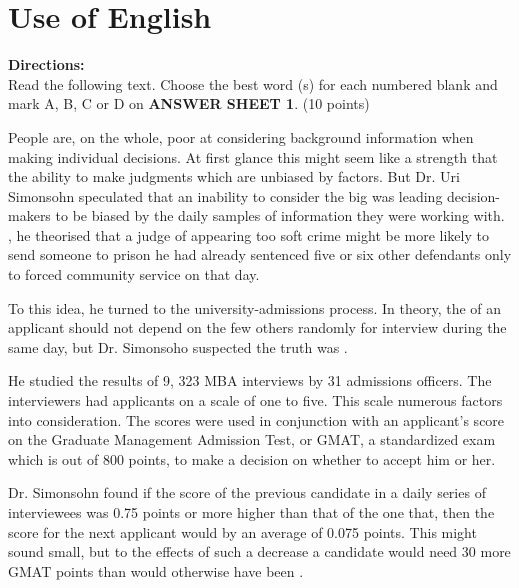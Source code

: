 



\section{Use of English}

\noindent
\textbf{Directions:}\\
Read the following text. Choose the best word (s) for each
	numbered blank and mark A, B, C or D on \textbf{ANSWER SHEET 1}. (10 points)



\TiGanSpace


People are, on the whole, poor at considering background information
when making individual decisions. At first glance this might seem like a
strength that \cloze the ability to make judgments which are
unbiased by \cloze factors. But Dr. Uri Simonsohn speculated that
an inability to consider the big \cloze was leading
decision-makers to be biased by the daily samples of information they
were working with. \cloze , he theorised that a
judge \cloze of appearing too soft \cloze crime might be
more likely to send someone to prison \cloze he had already
sentenced five or six other defendants only to forced community service
on that day.

To \cloze this idea, he turned to the university-admissions
process. In theory, the \cloze of an applicant should not depend
on the few others \cloze randomly for interview during the same
day, but Dr. Simonsoho suspected the truth was \cloze.

He studied the results of 9, 323 MBA interviews \cloze by 31
admissions officers. The interviewers had \cloze applicants on a
scale of one to five. This scale \cloze numerous factors into
consideration. The scores were \cloze used in conjunction with
an applicant's score on the Graduate Management Admission Test, or GMAT,
a standardized exam which is \cloze out of 800 points, to make a
decision on whether to accept him or her.

Dr. Simonsohn found if the score of the previous candidate in a daily
series of interviewees was 0.75 points or more higher than that of the
one \cloze that, then the score for the next applicant
would \cloze by an average of 0.075 points. This might sound
small, but to \cloze the effects of such a decrease a candidate
would need 30 more GMAT points than would otherwise have
been \cloze.



\newpage

